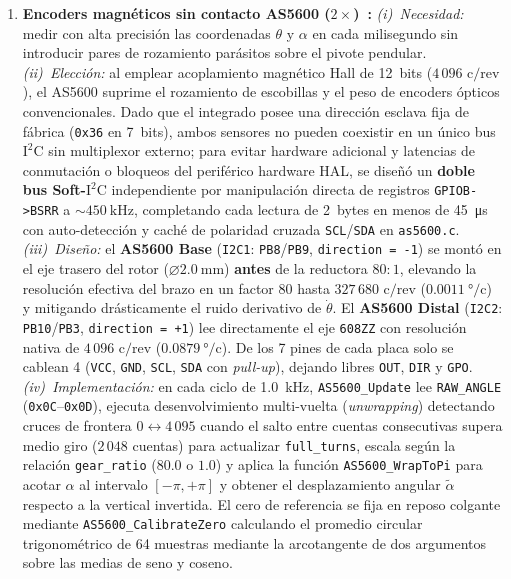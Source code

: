 \begin{enumerate}
    \item \textbf{Encoders magnéticos sin contacto AS5600 ($2\times$)~\cite{ams2018}:}
    \textit{(i)~Necesidad:} medir con alta precisión las coordenadas $\theta$ y $\alpha$ en cada milisegundo sin introducir pares de rozamiento parásitos sobre el pivote pendular.
    \textit{(ii)~Elección:} al emplear acoplamiento magnético Hall de 12~bits ($4\,096\text{ c/rev}$), el AS5600 suprime el rozamiento de escobillas y el peso de encoders ópticos convencionales. Dado que el integrado posee una dirección esclava fija de fábrica (\texttt{0x36} en 7~bits), ambos sensores no pueden coexistir en un único bus $\text{I}^2\text{C}$ sin multiplexor externo; para evitar hardware adicional y latencias de conmutación o bloqueos del periférico hardware HAL, se diseñó un \textbf{doble bus Soft-$\text{I}^2\text{C}$} independiente por manipulación directa de registros \texttt{GPIOB->BSRR} a $\sim\qty{450}{\kilo\hertz}$, completando cada lectura de 2~bytes en menos de \qty{45}{\micro\second} con auto-detección y caché de polaridad cruzada \texttt{SCL}/\texttt{SDA} en \texttt{as5600.c}.
    \textit{(iii)~Diseño:} el \textbf{AS5600 Base} (\texttt{I2C1}: \texttt{PB8}/\texttt{PB9}, \texttt{direction = -1}) se montó en el eje trasero del rotor ($\varnothing\qty{2.0}{\milli\meter}$) \textbf{antes} de la reductora $80:1$, elevando la resolución efectiva del brazo en un factor $80$ hasta $327\,680\text{ c/rev}$ ($\qty{0.0011}{\degree}/\text{c}$) y mitigando drásticamente el ruido derivativo de $\dot{\theta}$. El \textbf{AS5600 Distal} (\texttt{I2C2}: \texttt{PB10}/\texttt{PB3}, \texttt{direction = +1}) lee directamente el eje \texttt{608ZZ} con resolución nativa de $4\,096\text{ c/rev}$ ($\qty{0.0879}{\degree}/\text{c}$). De los 7 pines de cada placa solo se cablean 4 (\texttt{VCC}, \texttt{GND}, \texttt{SCL}, \texttt{SDA} con \textit{pull-up}), dejando libres \texttt{OUT}, \texttt{DIR} y \texttt{GPO}.
    \textit{(iv)~Implementación:} en cada ciclo de \qty{1.0}{\kilo\hertz}, \texttt{AS5600\_Update} lee \texttt{RAW\_ANGLE} (\texttt{0x0C}--\texttt{0x0D}), ejecuta desenvolvimiento multi-vuelta (\textit{unwrapping}) detectando cruces de frontera $0\leftrightarrow 4\,095$ cuando el salto entre cuentas consecutivas supera medio giro ($2\,048$ cuentas) para actualizar \texttt{full\_turns}, escala según la relación \texttt{gear\_ratio} ($80.0$ o $1.0$) y aplica la función \texttt{AS5600\_WrapToPi} para acotar $\alpha$ al intervalo $[-\pi, +\pi]$ y obtener el desplazamiento angular $\tilde{\alpha}$ respecto a la vertical invertida. El cero de referencia se fija en reposo colgante mediante \texttt{AS5600\_CalibrateZero} calculando el promedio circular trigonométrico de 64 muestras mediante la arcotangente de dos argumentos sobre las medias de seno y coseno.
\end{enumerate}

